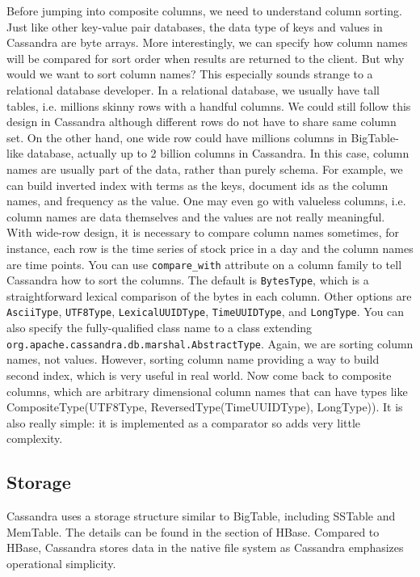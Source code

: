 \documentclass[11pt]{book}
\begin{document}
Before jumping into composite columns, we need to understand column sorting. Just like other key-value pair databases, the data type of keys and values in Cassandra are byte arrays. More interestingly, we can specify how column names will be compared for sort order when results are returned to the client. But why would we want to sort column names? This especially sounds strange to a relational database developer. In a relational database, we usually have tall tables, i.e. millions skinny rows with a handful columns. We could still follow this design in Cassandra although different rows do not have to share same column set. On the other hand, one wide row could have millions columns in BigTable-like database, actually up to 2 billion columns in Cassandra. In this case, column names are usually part of the data, rather than purely schema. For example, we can build inverted index with terms as the keys, document ids as the column names, and frequency as the value. One may even go with valueless columns, i.e. column names are data themselves and the values are not really meaningful. With wide-row design, it is necessary to compare column names sometimes, for instance, each row is the time series of stock price in a day and the column names are time points. You can use \texttt{compare\_with} attribute on a column family to tell Cassandra how to sort the columns. The default is \texttt{BytesType}, which is a straightforward lexical comparison of the bytes in each column. Other options are \texttt{AsciiType}, \texttt{UTF8Type}, \texttt{LexicalUUIDType}, \texttt{TimeUUIDType}, and \texttt{LongType}. You can also specify the fully-qualified class name to a class extending \texttt{org.apache.cassandra.db.marshal.AbstractType}. Again, we are sorting column names, not values. However, sorting column name providing a way to build second index, which is very useful in real world. Now come back to composite columns, which are arbitrary dimensional column names that can have types like CompositeType(UTF8Type, ReversedType(TimeUUIDType), LongType)). It is also really simple: it is implemented as a comparator so adds very little complexity.

\subsection{Storage}

Cassandra uses a storage structure similar to BigTable, including SSTable and MemTable. The details can be found in the section of HBase. Compared to HBase, Cassandra stores data in the native file system as Cassandra emphasizes operational simplicity.
\end{document}
